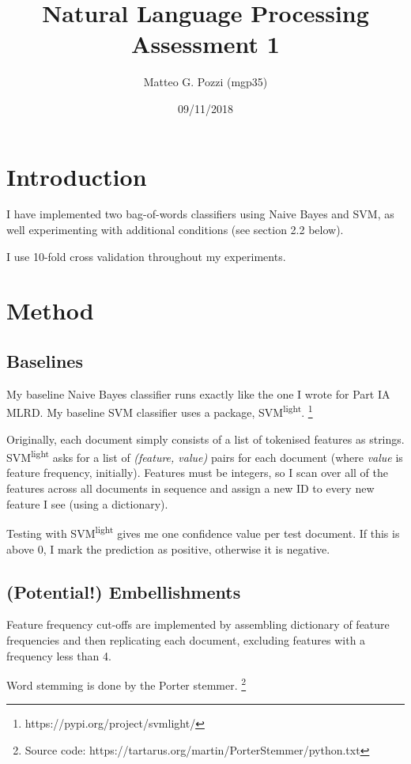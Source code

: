 \documentclass[12pt,a4paper,twoside]{article}
\title{%
  Natural Language Processing \\
  \large Assessment 1}
\author{Matteo G. Pozzi (mgp35)\vspace{-2ex}}
\date{09/11/2018\vspace{-2ex}}
\begin{document}
\maketitle


\section{Introduction}

I have implemented two bag-of-words classifiers using Naive Bayes and SVM, as well experimenting with additional conditions (see section 2.2 below).

I use 10-fold cross validation throughout my experiments.


\section{Method}

\subsection{Baselines}

My baseline Naive Bayes classifier runs exactly like the one I wrote for Part IA MLRD. My baseline SVM classifier uses a package, SVM\textsuperscript{light}. \footnote{https://pypi.org/project/svmlight/}

Originally, each document simply consists of a list of tokenised features as strings. SVM\textsuperscript{light} asks for a list of \textit{(feature, value)} pairs for each document (where \textit{value} is feature frequency, initially). Features must be integers, so I scan over all of the features across all documents in sequence and assign a new ID to every new feature I see (using a dictionary).

Testing with SVM\textsuperscript{light} gives me one confidence value per test document. If this is above 0, I mark the prediction as positive, otherwise it is negative.

\subsection{(Potential!) Embellishments}

Feature frequency cut-offs are implemented by assembling dictionary of feature frequencies and then replicating each document, excluding features with a frequency less than 4.

Word stemming is done by the Porter stemmer. \footnote{Source code: https://tartarus.org/martin/PorterStemmer/python.txt}
\end{document}
